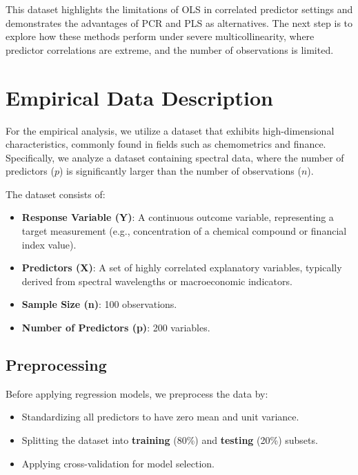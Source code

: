 \documentclass[11pt,twoside,a4paper]{article}
\begin{document}
This dataset highlights the limitations of OLS in correlated predictor settings and demonstrates the advantages of PCR and PLS as alternatives. The next step is to explore how these methods perform under severe multicollinearity, where predictor correlations are extreme, and the number of observations is limited.



\section{Empirical Data Description}

For the empirical analysis, we utilize a dataset that exhibits high-dimensional characteristics, commonly found in fields such as chemometrics and finance. Specifically, we analyze a dataset containing spectral data, where the number of predictors (\(p\)) is significantly larger than the number of observations (\(n\)).

The dataset consists of:
\begin{itemize}
    \item \textbf{Response Variable (Y)}: A continuous outcome variable, representing a target measurement (e.g., concentration of a chemical compound or financial index value).
    \item \textbf{Predictors (X)}: A set of highly correlated explanatory variables, typically derived from spectral wavelengths or macroeconomic indicators.
    \item \textbf{Sample Size (n)}: 100 observations.
    \item \textbf{Number of Predictors (p)}: 200 variables.
\end{itemize}

\subsection{Preprocessing}
Before applying regression models, we preprocess the data by:
\begin{itemize}
    \item Standardizing all predictors to have zero mean and unit variance.
    \item Splitting the dataset into \textbf{training} (80\%) and \textbf{testing} (20\%) subsets.
    \item Applying cross-validation for model selection.
\end{itemize}



\printbibliography
\end{document}
